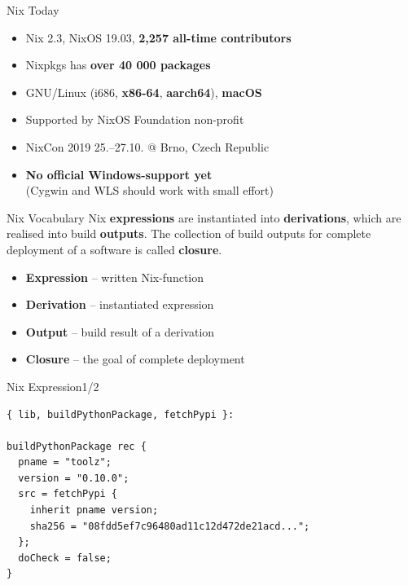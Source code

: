 \documentclass[12pt,aspectratio=169]{beamer}
\begin{document}

\begin{frame}{Nix Today}
  \begin{itemize}
    \item Nix 2.3, NixOS 19.03, \textbf{2,257 all-time contributors}
    \item Nixpkgs has \textbf{over 40 000 packages}
    \item GNU/Linux (i686, \textbf{x86-64}, \textbf{aarch64}), \textbf{macOS}
    \item Supported by NixOS Foundation non-profit
    \item NixCon 2019 25.--27.10. @ Brno, Czech Republic
  \end{itemize}
  \begin{itemize}
    \item \textbf{No official Windows-support yet} \\
    (Cygwin and WLS should work with small effort)
  \end{itemize}
\end{frame}


\begin{frame}{Nix Vocabulary}
  Nix \textbf{expressions} are instantiated into \textbf{derivations}, which are realised into build \textbf{outputs}. The collection of build outputs for complete deployment of a software is called \textbf{closure}.
  \par
  \dotfill
  \begin{itemize}
    \item \textbf{Expression} – written Nix-function
    \item \textbf{Derivation} – instantiated expression
    \item \textbf{Output} – build result of a derivation
    \item \textbf{Closure} – the goal of complete deployment
  \end{itemize}
\end{frame}


\begin{frame}[fragile]{Nix Expression\hfill1/2}
  \begin{verbatim}
{ lib, buildPythonPackage, fetchPypi }:

buildPythonPackage rec {
  pname = "toolz";
  version = "0.10.0";
  src = fetchPypi {
    inherit pname version;
    sha256 = "08fdd5ef7c96480ad11c12d472de21acd...";
  };
  doCheck = false;
}
  \end{verbatim}
\end{frame}
\end{document}

